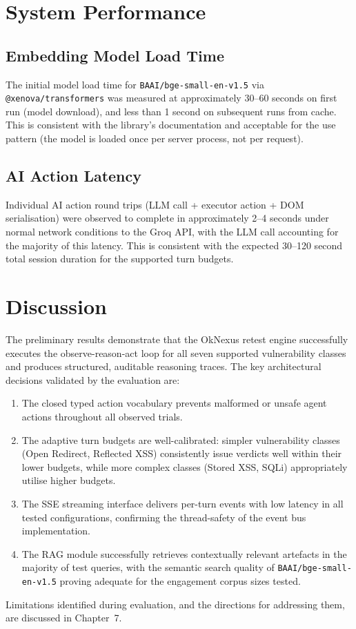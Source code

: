 \section{System Performance}

\subsection{Embedding Model Load Time}

The initial model load time for \texttt{BAAI/bge-small-en-v1.5} via \texttt{@xenova/transformers} was measured at approximately 30--60 seconds on first run (model download), and less than 1 second on subsequent runs from cache. This is consistent with the library's documentation and acceptable for the use pattern (the model is loaded once per server process, not per request).

\subsection{AI Action Latency}

Individual AI action round trips (LLM call + executor action + DOM serialisation) were observed to complete in approximately 2--4 seconds under normal network conditions to the Groq API, with the LLM call accounting for the majority of this latency. This is consistent with the expected 30--120 second total session duration for the supported turn budgets.

\section{Discussion}

The preliminary results demonstrate that the OkNexus retest engine successfully executes the observe-reason-act loop for all seven supported vulnerability classes and produces structured, auditable reasoning traces. The key architectural decisions validated by the evaluation are:

\begin{enumerate}
    \item The closed typed action vocabulary prevents malformed or unsafe agent actions throughout all observed trials.

    \item The adaptive turn budgets are well-calibrated: simpler vulnerability classes (Open Redirect, Reflected XSS) consistently issue verdicts well within their lower budgets, while more complex classes (Stored XSS, SQLi) appropriately utilise higher budgets.

    \item The SSE streaming interface delivers per-turn events with low latency in all tested configurations, confirming the thread-safety of the event bus implementation.

    \item The RAG module successfully retrieves contextually relevant artefacts in the majority of test queries, with the semantic search quality of \texttt{BAAI/bge-small-en-v1.5} proving adequate for the engagement corpus sizes tested.
\end{enumerate}

Limitations identified during evaluation, and the directions for addressing them, are discussed in Chapter~7.
